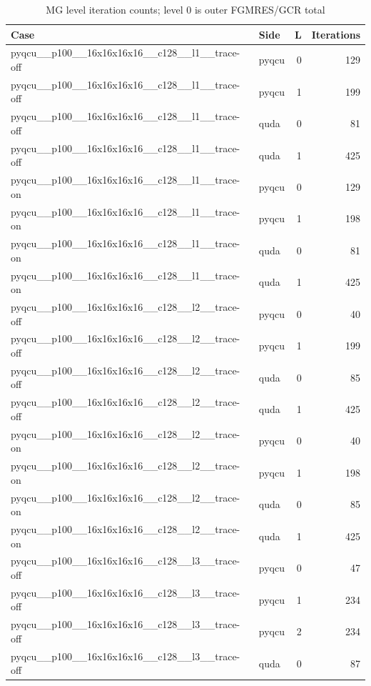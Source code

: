 \begin{table}[htbp]
\centering
\caption{MG level iteration counts; level 0 is outer FGMRES/GCR total}
\small
\begin{tabular}{@{}llrr@{}}
\toprule
Case & Side & L & Iterations \\
\midrule
pyqcu\_\_p100\_\_16x16x16x16\_\_c128\_\_l1\_\_trace-off & pyqcu & 0 & 129 \\
pyqcu\_\_p100\_\_16x16x16x16\_\_c128\_\_l1\_\_trace-off & pyqcu & 1 & 199 \\
pyqcu\_\_p100\_\_16x16x16x16\_\_c128\_\_l1\_\_trace-off & quda & 0 & 81 \\
pyqcu\_\_p100\_\_16x16x16x16\_\_c128\_\_l1\_\_trace-off & quda & 1 & 425 \\
pyqcu\_\_p100\_\_16x16x16x16\_\_c128\_\_l1\_\_trace-on & pyqcu & 0 & 129 \\
pyqcu\_\_p100\_\_16x16x16x16\_\_c128\_\_l1\_\_trace-on & pyqcu & 1 & 198 \\
pyqcu\_\_p100\_\_16x16x16x16\_\_c128\_\_l1\_\_trace-on & quda & 0 & 81 \\
pyqcu\_\_p100\_\_16x16x16x16\_\_c128\_\_l1\_\_trace-on & quda & 1 & 425 \\
pyqcu\_\_p100\_\_16x16x16x16\_\_c128\_\_l2\_\_trace-off & pyqcu & 0 & 40 \\
pyqcu\_\_p100\_\_16x16x16x16\_\_c128\_\_l2\_\_trace-off & pyqcu & 1 & 199 \\
pyqcu\_\_p100\_\_16x16x16x16\_\_c128\_\_l2\_\_trace-off & quda & 0 & 85 \\
pyqcu\_\_p100\_\_16x16x16x16\_\_c128\_\_l2\_\_trace-off & quda & 1 & 425 \\
pyqcu\_\_p100\_\_16x16x16x16\_\_c128\_\_l2\_\_trace-on & pyqcu & 0 & 40 \\
pyqcu\_\_p100\_\_16x16x16x16\_\_c128\_\_l2\_\_trace-on & pyqcu & 1 & 198 \\
pyqcu\_\_p100\_\_16x16x16x16\_\_c128\_\_l2\_\_trace-on & quda & 0 & 85 \\
pyqcu\_\_p100\_\_16x16x16x16\_\_c128\_\_l2\_\_trace-on & quda & 1 & 425 \\
pyqcu\_\_p100\_\_16x16x16x16\_\_c128\_\_l3\_\_trace-off & pyqcu & 0 & 47 \\
pyqcu\_\_p100\_\_16x16x16x16\_\_c128\_\_l3\_\_trace-off & pyqcu & 1 & 234 \\
pyqcu\_\_p100\_\_16x16x16x16\_\_c128\_\_l3\_\_trace-off & pyqcu & 2 & 234 \\
pyqcu\_\_p100\_\_16x16x16x16\_\_c128\_\_l3\_\_trace-off & quda & 0 & 87 \\

\end{tabular}
\end{table}
